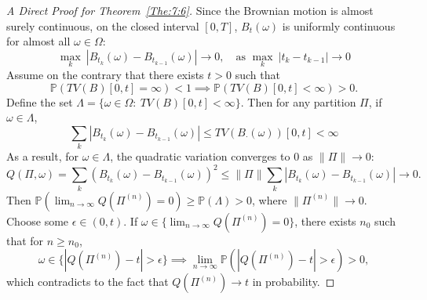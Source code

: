 \begin{proof}[A Direct Proof for Theorem~\ref{The:7:6}]
Since the Brownian motion is almost surely continuous, on the closed interval $[0,T]$,
$B_t(\omega)$ is uniformly continuous for almost all $\omega\in\Omega$:
\[
\max_k~|B_{t_k}(\omega) - B_{t_{k-1}}(\omega)|\to0,\quad\text{as }\max_k~|t_k - t_{k-1}|\to0
\]
Assume on the contrary that there exists $t>0$ such that 
\[
\mathbb{P}(TV(B)[0,t]=\infty)<1\implies
\mathbb{P}(TV(B)[0,t]<\infty)>0.
\]
Define the set $\Lambda = \{\omega\in\Omega:~TV(B)[0,t]<\infty\}$.
Then for any partition $\Pi$, if $\omega\in\Lambda$,
\[
\sum_k|B_{t_k}(\omega) - B_{t_{k-1}}(\omega)|\le TV(B_{\cdot}(\omega))[0,t]<\infty
\]
As a result, for $\omega\in\Lambda$, the quadratic variation converges to $0$ as $\|\Pi\|\to0$:
\[
Q(\Pi,\omega)=\sum_k(B_{t_k}(\omega) - B_{t_{k-1}}(\omega))^2\le \|\Pi\|\sum_k|B_{t_k}(\omega) - B_{t_{k-1}}(\omega)|\to0.
\]
Then $\mathbb{P}(\lim_{n\to\infty}Q(\Pi^{(n)})=0)\ge \mathbb{P}(\Lambda)>0$, where $\|\Pi^{(n)}\|\to0$.
Choose some $\epsilon\in(0,t)$.
If $\omega\in\{\lim_{n\to\infty}Q(\Pi^{(n)})=0\}$, there exists $n_0$ such that for $n\ge n_0$,
\[
\omega\in \{|Q(\Pi^{(n)})-t|>\epsilon\}\implies
\lim_{n\to\infty}\mathbb{P}(|Q(\Pi^{(n)})-t|>\epsilon)>0,
\]
which contradicts to the fact that $Q(\Pi^{(n)})\to t$ in probability.
\end{proof}

















